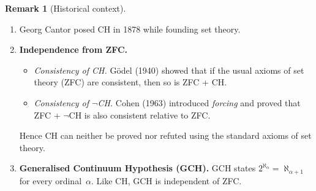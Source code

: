 \documentclass[12pt]{article}
\theoremstyle{definition} %
\newtheorem{remark}{Remark}
\theoremstyle{plain} %
\begin{document}
  \begin{remark}[Historical context]
  \begin{enumerate}
    \item Georg Cantor posed CH in 1878 while founding set theory.
    \item \textbf{Independence from ZFC.}
          \begin{itemize}
            \item \emph{Consistency of CH.}  
                  Gödel (1940) showed that if the usual axioms of
                  set theory (ZFC) are consistent, then so is
                  ZFC + CH.
            \item \emph{Consistency of $\lnot$CH.}  
                  Cohen (1963) introduced \emph{forcing}
                  and proved that ZFC + $\lnot$CH is also consistent
                  relative to ZFC.
          \end{itemize}
          Hence CH can neither be proved nor refuted using the
          standard axioms of set theory.
    \item \textbf{Generalised Continuum Hypothesis (GCH).}  
          GCH states \(2^{\aleph_{\alpha}}=\aleph_{\alpha+1}\) for every
          ordinal~\(\alpha\).
          Like CH, GCH is independent of ZFC.
  \end{enumerate}
  \end{remark}
\end{document}
